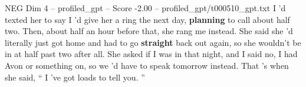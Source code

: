 \begin{textsample}{NEG Dim 4 – profiled\_gpt – Score -2.00 – profiled\_gpt/t000510\_gpt.txt}  \label{ex:f4_neg_019}
I ’d texted her to say I ’d give her a ring the next day, \textbf{planning} to call about half two.
Then, about half an hour before that, she rang me instead.
She said she ’d literally just got home and had to go \textbf{straight} back out again, so she wouldn't be in at half past two after all.
She asked if I was in that night, and I said no, I had Avon or something on, so we ’d have to speak tomorrow instead.
That ’s when she said, “ I ’ve got loads to tell you. ”

\end{textsample}
